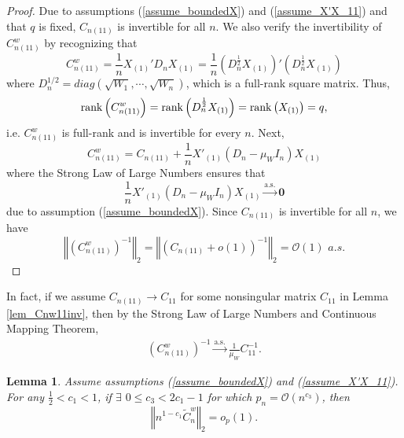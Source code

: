 \documentclass[ejs,authoryear,linksfromyear]{imsart}
\newcommand{\CONV}[1]{\stackrel{\text{#1}}{\longrightarrow}} %
\newcommand{\cnwa}{C_{n(11)}^w}
\numberwithin{equation}{section}
\theoremstyle{plain}
\newtheorem{lem}{Lemma}[section]
\begin{document}
\begin{proof}
	Due to assumptions (\ref{assume_boundedX}) and (\ref{assume_X'X_11}) and that $q$ is fixed, $C_{n(11)}$ is invertible for all $n$. We also verify the invertibility of $\cnwa$ by recognizing that 
	$$
	\cnwa = \dfrac{1}{n} X_{(1)}' D_n X_{(1)} = 
	\dfrac{1}{n} \left( D_n^{\frac{1}{2}} X_{(1)} \right)'
	\left( D_n^{\frac{1}{2}} X_{(1)} \right) 
	$$
	where $D_n^{1/2} = diag \left(\sqrt{W_1}, \cdots, \sqrt{W_n} \right)$, which is a full-rank square matrix. Thus,
	$$
	{\rm rank} \left( \cnwa \right)
	= {\rm rank} \left( D_n^{\frac{1}{2}} X_{(1)} \right)
	= {\rm rank} \left( X_{(1)} \right)
	= q,
	$$
	i.e. $\cnwa$ is full-rank and is invertible for every $n$. Next, 
	$$
	\cnwa = C_{n(11)} + 
	\dfrac{1}{n} X'_{(1)} (D_n - \mu_W I_n) X_{(1)}
	$$
	where the Strong Law of Large Numbers ensures that
	$$
	\dfrac{1}{n} X'_{(1)} (D_n - \mu_W I_n) X_{(1)}
	\CONV{a.s.} \bm{0} 
	$$
	due to assumption (\ref{assume_boundedX}). Since $C_{n(11)}$ is invertible for all $n$, we have 
	$$
	\left\Vert
	 \left( \cnwa \right)^{-1} 
	\right\Vert_2
	= \left\Vert
		\left( C_{n(11)} + o(1) \right)^{-1}
	\right\Vert_2
	= \mathcal{O}(1) \,\, a.s.
	$$
\end{proof}

In fact, if we assume $C_{n(11)} \to C_{11}$ for some nonsingular matrix $C_{11}$ in Lemma \ref{lem_Cnw11inv}, then by the Strong Law of Large Numbers and Continuous Mapping Theorem,
	\begin{align*}
	\left( \cnwa \right)^{-1}
	\CONV{a.s.} \frac{1}{\mu_W} C_{11}^{-1}. 
	\end{align*}
 
\begin{lem} \label{lem_CtildeW}
Assume assumptions (\ref{assume_boundedX}) and (\ref{assume_X'X_11}). For any $\frac{1}{2} < c_1 < 1$, if $\exists$ $0 \leq c_3 < 2 c_1 - 1$ for which $p_n = \mathcal{O}(n^{c_3})$, then
$$
\left\Vert
n^{1-c_1} \widetilde{C}^w_n 
\right\Vert_2 
= o_p(1). 
$$
\end{lem} 
\end{document}
